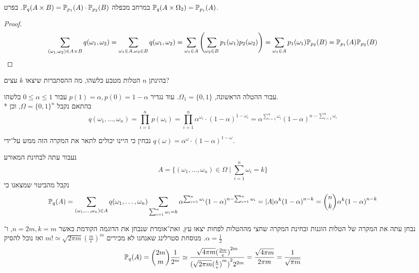 \begin{proposition}
	במרחב מכפלה $\mathbb{P}_q(A \times B) = \mathbb{P}_{p_1}(A) \cdot \mathbb{P}_{p_2}(B)$.
	בפרט $\mathbb{P}_q(A \times \Omega_2) = \mathbb{P}_{p_1}(A)$.
\end{proposition}
\begin{proof}
	\[
		\sum_{(\omega_1, \omega_2) \in A \times B} q(\omega_1, \omega_2)
		= \sum_{\omega_1 \in A, \omega_2 \in B} q(\omega_1, \omega_2)
		= \sum_{\omega_1 \in A} \left( \sum_{\omega_2 \in B} p_1(\omega_1) p_2(\omega_2) \right)
		= \sum_{\omega_1 \in A} p_1(\omega_1) \mathbb{P}_{p_2}(B)
		= \mathbb{P}_{p_1}(A) \mathbb{P}_{p_2}(B)
	\]
\end{proof}
\begin{example}
	בהינתן $n$ הטלות מטבע כלשהו, מה ההסתברות שיצאו $k$ עצים?

	עבור ההטלה הראשונה, $\Omega_1 = \{0, 1\}$. עוד נגדיר $p(1) = \alpha, p(0) = 1 - \alpha$ עבור $0 \le \alpha \le 1$ כלשהו. \\*
	בהתאם נקבל $\Omega = {\{0, 1\}}^n$, וכן
	\[
		q(\omega_1, \dots, \omega_n) = \prod_{i = 1}^n p(\omega_i)
		= \prod_{i = 1}^n \alpha^{\omega_i} \cdot {(1 - \alpha)}^{1 - {\omega_i}}
		= \alpha^{\sum_{i = 1}^n \omega_i} {(1 - \alpha)}^{n - \sum_{i = 1}^n \omega_i}
	\]

	נבחין כי היינו יכולים לתאר את המקרה הזה ממש על־ידי $q(\omega) = \alpha^\omega \cdot {(1 - \alpha)}^{1 - \omega}$.

	נעבור עתה לבחינת המאורע
	\[
		A = \{ (\omega_1, \dots, \omega_n) \in \Omega \mid \sum_{i = 1}^{n} \omega_i = k \}
	\]
	נקבל מהביטוי שמצאנו כי
	\[
		\mathbb{P}_q(A)
		= \sum_{(\omega_1, \dots, \omega_n) \in A} q(\omega_1, \dots, \omega_n)
		\sum_{\sum_{i = 1}^n \omega_i = k} \alpha^{\sum_{i = 1}^n \omega_i} {(1 - \alpha)}^{n - \sum_{i = 1}^n \omega_i}
		= |A| \alpha^k {(1 - \alpha)}^{n - k}
		= \binom{n}{k} \alpha^k {(1 - \alpha)}^{n - k}
	\]
\end{example}
\begin{example}
	נבחן עתה את המקרה של הטלות הוגנות ובחינת המקרה שחצי מההטלות לפחות יצאו עץ,
	זאת־אומרת שנבחן את הדוגמה הקודמת כאשר $n = 2m, k = m$, ו־$\alpha = \frac{1}{2}$.
	מנוסחת סטרלינג שאנחנו לא מכירים $m! \simeq \sqrt{2\pi m} {(\frac{m}{e})}^m$ ואז נוכל להסיק
	\[
		\mathbb{P}_q(A)
		= \binom{2m}{m} \frac{1}{2^m}
		\simeq \frac{\sqrt{4\pi m} {(\frac{2m}{e})}^{2m}}{{(\sqrt{2\pi m} {(\frac{k}{e})}^m)}^2 2^{2m}}
		= \frac{\sqrt{4\pi m}}{2\pi m}
		= \frac{1}{\sqrt{\pi m}}
	\]
\end{example}

